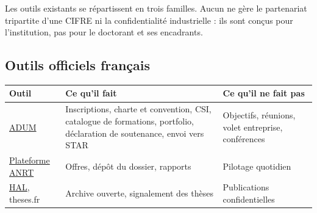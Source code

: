 \documentclass[11pt,a4paper]{article}
\begin{document}
Les outils existants se répartissent en trois familles. Aucun ne gère le partenariat
tripartite d'une CIFRE ni la confidentialité industrielle : ils sont conçus pour
l'institution, pas pour le doctorant et ses encadrants.

\subsection{Outils officiels français}
\begin{center}\small
\begin{tabularx}{\linewidth}{P{3.2cm} L L}
\toprule
\textbf{Outil} & \textbf{Ce qu'il fait} & \textbf{Ce qu'il ne fait pas}\\
\midrule
\href{https://www.adum.fr}{ADUM} & Inscriptions, charte et convention, CSI, catalogue de formations, portfolio, déclaration de soutenance, envoi vers STAR & Objectifs, réunions, volet entreprise, conférences\\
\href{https://offres-et-candidatures-cifre.anrt.asso.fr/}{Plateforme ANRT} & Offres, dépôt du dossier, rapports & Pilotage quotidien\\
\href{https://hal.science}{HAL}, theses.fr & Archive ouverte, signalement des thèses & Publications confidentielles\\
\bottomrule
\end{tabularx}
\end{center}
\end{document}
